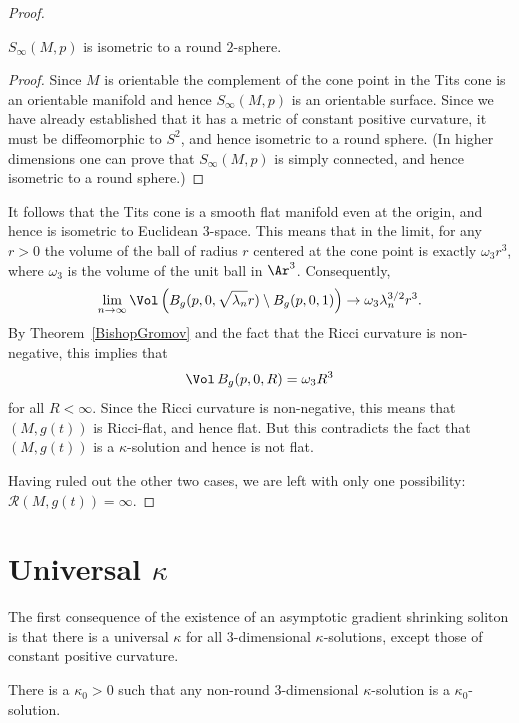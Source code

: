 \begin{proof}
\begin{claim}\label{claim:sphere-at-infinity-round}
 $S_\infty(M,p)$ is isometric to a round $2$-sphere.
 \end{claim}

\begin{proof}
Since $M$ is orientable the complement of the cone point in the Tits
cone is an orientable manifold and hence $S_\infty(M,p)$ is an
orientable surface. Since we have already established that it has a
metric of constant positive curvature, it must be diffeomorphic to
$S^2$, and hence isometric to a round sphere. (In higher dimensions
one can prove that $S_\infty(M,p)$ is simply connected, and hence
isometric to a round sphere.)
\end{proof}

It follows that the Tits cone is a smooth flat manifold even at the origin, and
hence is isometric to Euclidean $3$-space. This means that in the limit, for
any $r>0$ the volume of the ball of radius $r$ centered at the cone point
  is exactly $\omega_3 r^3$, where
$\omega_3$ is the volume of the unit ball in $\Ar^3$. Consequently,
$$\lim_{n\rightarrow\infty}
\Vol\left(B_{g}(p,0,\sqrt{\lambda_n}r)\setminus
B_g(p,0,1)\right)\rightarrow \omega_3\lambda_n^{3/2}r^3.$$ By
Theorem~\ref{BishopGromov} and the fact that the Ricci curvature is
non-negative, this implies that
$$\Vol\, B_g(p,0,R)=\omega_3R^3$$
for all $R<\infty$. Since the Ricci curvature is non-negative, this
means that $(M,g(t))$ is Ricci-flat, and hence flat. But this
contradicts the fact that $(M,g(t))$ is a $\kappa$-solution and
hence is not flat.

Having ruled out the other two cases, we are left with only one possibility:
${\mathcal R}(M,g(t))=\infty$.
\end{proof}


\section{Universal $\kappa$}

The first consequence of the existence of an asymptotic gradient
shrinking soliton is that there is a universal $\kappa$ for all
$3$-dimensional $\kappa$-solutions, except those of constant
positive curvature.


\begin{proposition}\label{prop:universal-kappa-non-round}
\label{kappa0}
There is a $\kappa_0>0$ such that any non-round $3$-dimensional
$\kappa$-solution is a $\kappa_0$-solution.
\end{proposition}

